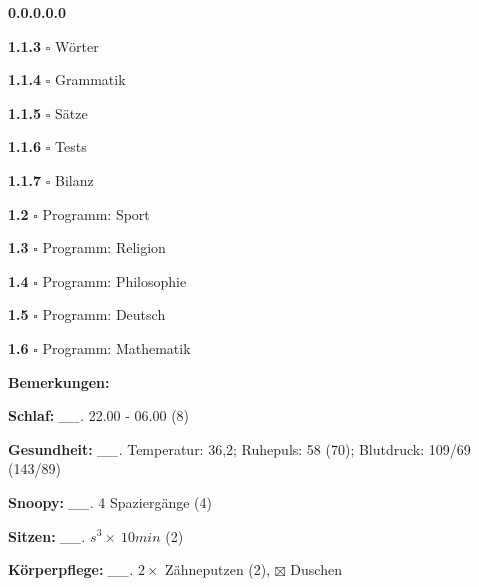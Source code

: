 \documentclass[10pt,a4paper]{article}
\newcommand\mand[1] {{\color {burntorange} {\bf #1}}}          %
\newcommand\n[1] { {\sl #1.} \hskip 5pt }
\begin{document}
\begin{mdframed}[style=daystyle]
\begin{minipage}{0.75\textwidth}
\begin{labeling}{{\bf 0.0.0.0.0}}
    \vskip 2pt
    \item[{\bf 1.1.3}] $\square$ Wörter

    \vskip 2pt
    \item[{\bf 1.1.4}] $\square$ Grammatik

    \vskip 2pt
    \item[{\bf 1.1.5}] $\square$ Sätze

    \vskip 2pt
    \item[{\bf 1.1.6}] $\square$ Tests
    
    \vskip 2pt
    \item[{\bf 1.1.7}] $\square$ Bilanz
      
    
    \vskip 2pt
    \item[{\bf 1.2}] $\square$ Programm: Sport

    \vskip 2pt
    \item[{\bf 1.3}] $\square$ Programm: Religion

    \vskip 2pt
    \item[{\bf 1.4}] $\square$ Programm: Philosophie

    \vskip 2pt
    \item[{\bf 1.5}] $\square$ Programm: Deutsch

    \vskip 2pt
    \item[{\bf 1.6}] $\square$ Programm: Mathematik

    \end{labeling}
  \end{minipage}

  
  \begin{labeling}{{\mand {Bemerkungen:}}}
    \setlength\itemsep{-3pt}
  \item[{\mand {Schlaf:}}]        \n{\_\_} 22.00 - 06.00 (8)
  \item[{\mand {Gesundheit:}}]    \n{\_\_} Temperatur: 36,2; Ruhepuls: 58 (70); Blutdruck: 109/69 (143/89)
  \item[{\mand {Snoopy:}}]        \n{\_\_} 4 Spaziergänge (4)
  \item[{\mand {Sitzen:}}]        \n{\_\_} $s^3 \times\ 10 min$ (2)
  \item[{\mand {Körperpflege:}}]  \n{\_\_} $2 \times$ Zähneputzen (2), $\boxtimes$ Duschen


\end{labeling}
\end{mdframed}
\end{document}
